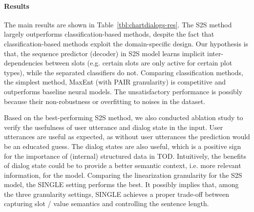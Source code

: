 \documentclass[11pt,dvipdfm]{article}
\begin{document}
\paragraph{Results} The main results are shown in Table~\ref{tbl:chartdialogs-res}. The S2S method largely outperforms classification-based methods, despite the fact that classification-based methods exploit the domain-specific design. Our hypothesis is that, the sequence predictor (decoder) in S2S model learns implicit inter-dependencies between slots (e.g. certain slots are only active for certain plot types), while the separated classifiers do not.
Comparing classification methods, the simplest method, MaxEnt (with PAIR granularity) is competitive and outperforms baseline neural models. The unsatisfactory performance is possibly because their non-robustness or overfitting to noises in the dataset.

Based on the best-performing S2S method, we also conducted ablation study to verify the usefulness of user utterance and dialog state in the input. User utterances are useful as expected, as without user utterances the prediction would be an educated guess. The dialog states are also useful, which is a positive sign for the importance of (internal) structured data in TOD. Intuitively, the benefits of dialog state could be to provide a better semantic context, i.e. more relevant information, for the model.
Comparing the linearization granularity for the S2S model, the SINGLE setting performs the best. It possibly implies that, among the three granularity settings, SINGLE achieves a proper trade-off between capturing slot / value semantics and controlling the sentence length.
\end{document}
